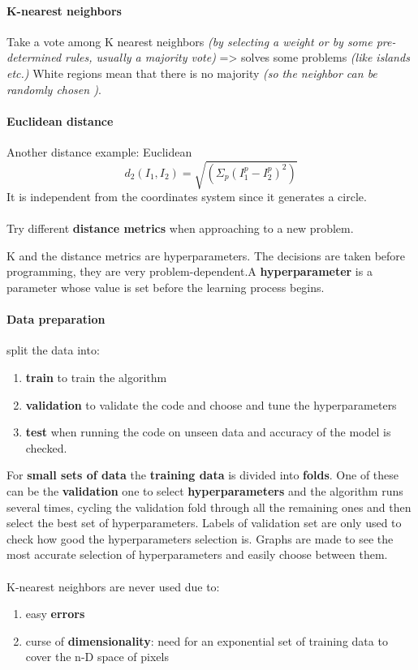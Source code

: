 \documentclass[11pt]{article}
\begin{document}
\paragraph{K-nearest neighbors}
Take a vote among K nearest neighbors \textit{(by selecting a weight or by some pre-determined rules, usually a majority vote) } => solves some problems \textit{(like islands etc.)}
White regions mean that there is no majority \textit{(so  the neighbor can be randomly chosen )}.
\paragraph{Euclidean distance}
Another distance example: Euclidean
\begin{equation}
 d_2(I_1, I_2) = \sqrt{(\Sigma_p (I_1^p - I_2^p)^2) }
\end{equation}{}
It is independent from the coordinates system since it generates a circle.\\\\
Try different \textbf{distance metrics }when approaching to a new problem.

K and the distance metrics are hyperparameters.  The  decisions are taken before programming, they are very problem-dependent.A \textbf{hyperparameter} is a parameter whose value is set before the learning process begins.
\paragraph{Data preparation}
split the data into:
\begin{enumerate}
    \item \textbf{train} to train the algorithm
    \item \textbf{validation} to validate the code and choose and tune the hyperparameters \item \textbf{test} when  running the code on unseen data and accuracy of the model is checked. 
\end{enumerate}{}
For \textbf{small sets of data} the \textbf{training  data }is divided  into \textbf{folds}. One of these can be the \textbf{validation} one to select \textbf{hyperparameters} and the algorithm runs several times, cycling the validation fold through all the remaining ones and then select the best set of hyperparameters. Labels of validation set are only used to check how good the hyperparameters selection is.
Graphs are made to see the most accurate selection of hyperparameters and easily choose between them.\\\\
K-nearest neighbors are never used  due to:
\begin{enumerate}
    \item easy \textbf{errors}
    \item curse of \textbf{dimensionality}:  need for an exponential set of training data to cover the n-D space of pixels
\end{enumerate}{}
\end{document}
